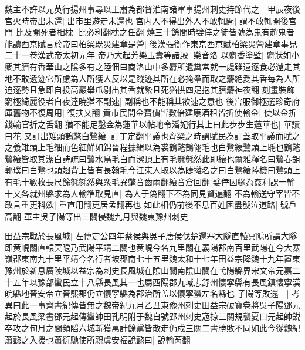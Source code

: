 魏主不許以元英行揚州事尋以王肅為都督淮南諸軍事揚州刺史持節代之　甲辰夜後宫火時帝出未還|{
	出市里遊走未還也}
宫内人不得出外人不敢輒開|{
	謂不敢輒開後宫門}
比及開死者相枕|{
	比必利翻枕之任翻}
燒三十餘間時嬖倖之徒皆號為鬼有趙鬼者能讀西京賦言於帝曰柏梁既災建章是營|{
	後漢張衡作東京西京賦柏梁災營建章事見二十一卷漢武帝太初元年}
帝乃大起芳樂玉壽等諸殿|{
	樂音洛}
以麝香塗壁|{
	麝狀如小麋其臍有香華山之隂多有之陸佃曰商洛山中多麝所遺糞常就一處雖遠逐食必還走其地不敢遺迹它所慮為人所獲人反以是蹤迹其所在必掩羣而取之麝絶愛其香每為人所迫逐勢且急即自投高巖舉爪剔出其香就縶且死猶拱四足抱其臍麝神夜翻}
刻畫裝飾窮極綺麗役者自夜逹暁猶不副速|{
	副稱也不能稱其欲速之意也}
後宫服御極選珍奇府庫舊物不復周用|{
	復扶又翻}
貴市民間金寶價皆數倍建康酒租皆折使輸金|{
	使以金折錢輸官折之舌翻}
猶不能足鑿金為蓮華以帖地令潘妃行其上曰此步步生蓮華也|{
	華讀曰花}
又訂出雉頭鶴氅白鷺縗|{
	訂丁定翻平議也齊梁之時謂賦民為訂蓋取平議而賦之之義雉頭上毛細而色紅鮮如錦晉程據緝以為裘鶴氅鶴翎毛也白鷺縗鷺頭上毦也鶴氅鷺縗皆取其潔白詩疏曰鷺水鳥毛白而潔頂上有毛毿毿然此即縗也爾雅釋名曰鷺春鉏郭璞曰白鷺也頭翅背上皆有長翰毛今江東人取以為睫攡名之曰白鷺縗陸機曰鷺頭上有毛十數枚長尺餘毿毿然與衆毛異氅音齒兩翻縗音倉回翻}
嬖倖因緣為姦利課一輸十又各就州縣求為人輸準取見直|{
	為人于偽翻下不為同見賢遍翻}
不為輸送守宰皆不敢言重更科歛|{
	重直用翻更居孟翻再也}
如此相仍前後不息百姓困盡號泣道路|{
	號戶高翻}
軍主吳子陽等出三關侵魏九月與魏東豫州刺史

田益宗戰於長風城|{
	左傳定公四年蔡侯與吳子唐侯伐楚還塞大隧直轅冥阸所謂大隧即黄峴關直轅冥阸乃武陽平靖二關也黄峴今名九里關在義陽郡南百里武陽在今大寨嶺郡東南九十里平靖今名行者坡郡南七十五里魏太和十七年田益宗降魏十九年置東豫州於新息廣陵城以益宗為刺史長風城在隂山關南隂山關在弋陽縣界宋文帝元嘉二十五年以豫部蠻民立十八縣長風其一也屬西陽郡九域志舒州懷寧縣有長風鎮懷寧漢皖縣地晉安帝立晉熙郡仍立懷寜縣為郡治所盖以懷寧蠻左名縣也}
子陽等敗還　|{
	考異曰此一事齊書紀傳皆無之魏帝紀九月乙丑東豫州刺史田益宗破寶卷將吳子陽鄧元起於長風梁書鄧元起傳蠻帥田孔明附于魏自號郢州刺史宼掠三關規襲夏口元起帥鋭卒攻之旬月之間頻䧟六城斬獲萬計餘黨皆散走仍戍三關二書勝敗不同如此今從魏紀}
蕭懿之入援也蕭衍馳使所親虞安福說懿曰|{
	說輸芮翻}



